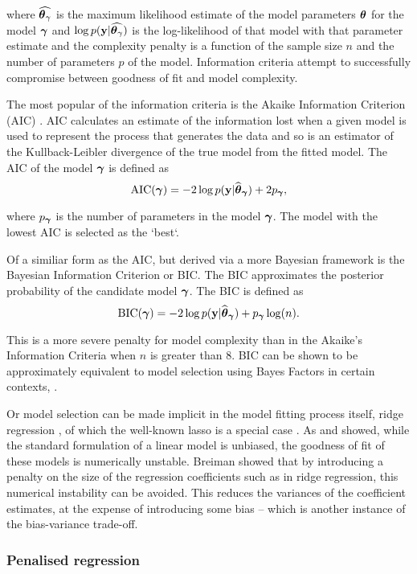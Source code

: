 \noindent where $\widehat{{\boldsymbol \theta}_\gamma}$ is the maximum likelihood estimate of
the model parameters ${\boldsymbol \theta}$ for the model ${\boldsymbol \gamma}$ and $\log p({\bf y} |
\widehat{{\boldsymbol \theta}_\gamma})$ is the log-likelihood of that model with that
parameter estimate and the complexity penalty is a function of the sample size
$n$ and the number of parameters $p$ of the model. Information criteria attempt
to successfully compromise between goodness of fit and model complexity.

The most popular of the information criteria is the Akaike Information Criterion
(AIC) \citep{Akaike1974}. AIC calculates an estimate of the information lost
when a given model is used to represent the process that generates the data and
so is an estimator of the Kullback-Leibler divergence of the true model from the
fitted model. The AIC of the model ${\boldsymbol \gamma}$ is defined as
$$
	\text{AIC}({\boldsymbol \gamma}) = -2 \log p({\bf y} | \widehat{{\boldsymbol \theta}}_{\boldsymbol \gamma}) + 2 p_{\boldsymbol \gamma},
$$

\noindent where $p_{\boldsymbol \gamma}$ is the number of parameters in the model ${\boldsymbol \gamma}$.
The model with the lowest AIC is selected as the `best`.

Of a similiar form as the AIC, but derived via a more Bayesian framework is the
Bayesian Information Criterion or BIC. The BIC approximates the posterior
probability of the candidate model ${\boldsymbol \gamma}$. The BIC is defined as
$$
	\text{BIC}({\boldsymbol \gamma}) = -2 \log p({\bf y} | \widehat{{\boldsymbol \theta}}_{\boldsymbol \gamma}) + p_{\boldsymbol \gamma} \log(n).
$$

\noindent This is a more severe penalty for model complexity than in the
Akaike's Information Criteria when $n$ is greater than $8$. BIC can be shown to
be approximately equivalent to model selection using Bayes Factors in certain
contexts, \cite{Kass1993}.

Or model selection can be made implicit in the model fitting process itself,
ridge regression \citep{Casella1980}, of which the well-known lasso is a special
case \citep{Tibshirani1996}. As \citep{Breiman1996} and \citep{Efron2013}
showed, while  the standard formulation of a linear model is unbiased, the
goodness of fit of these models is numerically  unstable. Breiman showed that by
introducing a penalty on the size of the regression coefficients such as  in
ridge regression, this numerical instability can be avoided. This reduces the
variances of the coefficient estimates, at the expense of introducing some bias
-- which is another instance of the bias-variance trade-off.

\subsubsection{Penalised regression}

